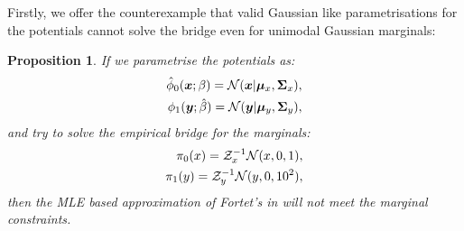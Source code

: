\documentclass[a4paper,12pt,twoside,openright]{report}
\newtheorem{proposition}{Proposition}
\theoremstyle{definition}
\begin{document}
Firstly, we offer the counterexample that valid Gaussian like parametrisations for the potentials cannot solve the bridge even for unimodal Gaussian marginals:
\begin{proposition}
If we parametrise the potentials as:
\begin{align}
{\hat{\phi}}_0( {\bm{x}} ; \beta) =  {\mathcal{N}}({\bm{x}} | {\bm{\mu}}_x, {\bm{\Sigma}}_x), \\
\phi_1( {\bm{y}} ; \hat{\beta}) =  {\mathcal{N}}({\bm{y}} | {\bm{\mu}}_y, {\bm{\Sigma}}_y) ,
\end{align}
and try to solve the empirical bridge for the marginals:
\begin{align*}
    \pi_0(x) =  \mathcal{Z}_x^{-1}{\mathcal{N}}(x,0, 1), \\
    \pi_1(y) = \mathcal{Z}_y^{-1} {\mathcal{N}}(y,0, 10^2),
\end{align*}
then the MLE based approximation of Fortet's in \cite{pavon2018data} will not meet the marginal constraints.
\end{proposition}
\end{document}
